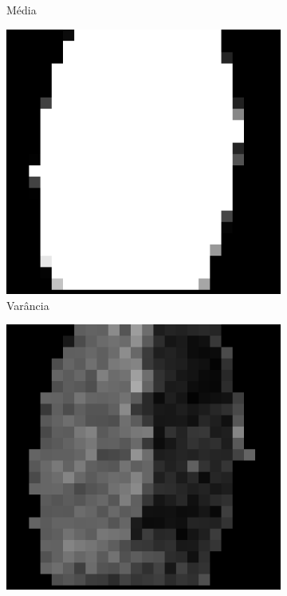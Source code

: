 \documentclass[10pt,a4paper]{article}
\begin{document}
\begin{figure}[!ht]
\begin{subfigure}[ht]{0.25\textwidth}
        \caption{Média}
    \end{subfigure}
    \qquad
    \begin{subfigure}[ht]{0.25\textwidth}
        \includegraphics[width=\textwidth]{Fingerprints/1_1_vari.jpg}
        \caption{Varância}
    \end{subfigure}
    \qquad
    \begin{subfigure}[ht]{0.25\textwidth}
        \includegraphics[width=\textwidth]{Fingerprints/1_1_cohe.jpg}

\end{subfigure}
\end{figure}
\end{document}
